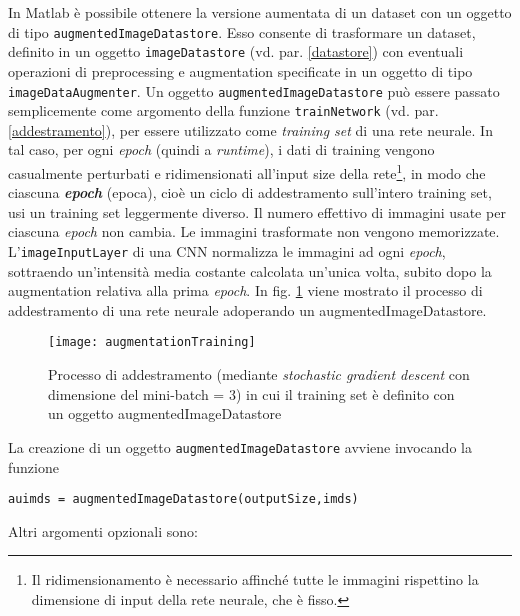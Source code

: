 In Matlab è possibile ottenere la versione aumentata di un dataset con un oggetto di tipo \verb|augmentedImageDatastore|. Esso consente di trasformare un dataset, definito in un oggetto \verb|imageDatastore| (vd. par. \ref{datastore}) con eventuali operazioni di preprocessing e augmentation specificate in un oggetto di tipo \verb|imageDataAugmenter|.
Un oggetto \verb|augmentedImageDatastore| può essere passato semplicemente come argomento della funzione \verb|trainNetwork| (vd. par. \ref{addestramento}), per essere utilizzato come \textit{training set} di una rete neurale. In tal caso, per ogni \textit{epoch} (quindi a \textit{runtime}), i dati di training vengono casualmente perturbati e ridimensionati all'input size della rete\footnote{Il ridimensionamento è necessario affinché tutte le immagini rispettino la dimensione di input della rete neurale, che è fisso.}, in modo che ciascuna \textbf{\textit{epoch}} (epoca), cioè un ciclo di addestramento sull'intero training set, usi un training set leggermente diverso. Il numero effettivo di immagini usate per ciascuna \textit{epoch} non cambia. Le immagini trasformate non vengono memorizzate. L'\verb|imageInputLayer| di una CNN normalizza le immagini ad ogni \textit{epoch}, sottraendo un'intensità media costante calcolata un'unica volta, subito dopo la augmentation relativa alla prima \textit{epoch}. In fig. \ref{fig:augmentationTraining} viene mostrato il processo di addestramento di una rete neurale adoperando un augmentedImageDatastore.\\

\begin{figure}[h]
\centering
\texttt{[image: augmentationTraining]}
\caption{Processo di addestramento (mediante \textit{stochastic gradient descent} con dimensione del mini-batch = 3) in cui il training set è definito con un oggetto augmentedImageDatastore}
\label{fig:augmentationTraining}
\end{figure}

La creazione di un oggetto \verb|augmentedImageDatastore| avviene invocando la funzione

\begin{verbatim}
auimds = augmentedImageDatastore(outputSize,imds)
\end{verbatim}

Altri argomenti opzionali sono:

